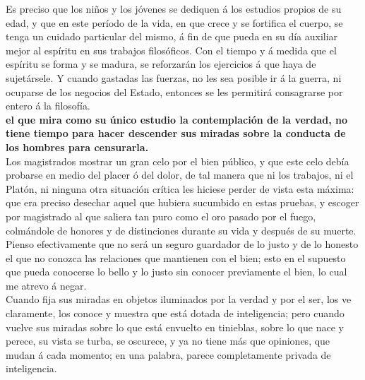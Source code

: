 \documentclass[10pt]{book}
\begin{document}
Es preciso que los niños y los jóvenes se dediquen á los estudios propios de su edad, y que en este período de la vida, en que crece y se fortifica el cuerpo, se tenga un cuidado particular del mismo, á fin de que pueda en su día auxiliar mejor al espíritu en sus trabajos filosóficos. Con el tiempo y á medida que el espíritu se forma y se madura, se reforzarán los ejercicios á que haya de sujetársele. Y cuando gastadas las fuerzas, no les sea posible ir á la guerra, ni ocuparse de los negocios del Estado, entonces se les permitirá consagrarse por entero á la filosofía.\\
\textbf{el que mira como su único estudio la contemplación de la verdad, no tiene tiempo para hacer descender sus miradas sobre la conducta de los hombres para censurarla.}\\
Los magistrados mostrar un gran celo por el bien público, y que este celo debía probarse en medio del placer ó del dolor, de tal manera que ni los trabajos, ni el Platón, ni ninguna otra situación crítica les hiciese perder de vista esta máxima: que era preciso desechar aquel que hubiera sucumbido en estas pruebas, y escoger por magistrado al que saliera tan puro como el oro pasado por el fuego, colmándole de honores y de distinciones durante su vida y después de su muerte.\\
Pienso efectivamente que no será un seguro guardador de lo justo y de lo honesto el que no conozca las relaciones que mantienen con el bien; esto en el supuesto que pueda conocerse lo bello y lo justo sin conocer previamente el bien, lo cual me atrevo á negar. \\
Cuando fija sus miradas en objetos iluminados por la verdad y por el ser, los ve claramente, los conoce y muestra que está dotada de inteligencia; pero cuando vuelve sus miradas sobre lo que está envuelto en tinieblas, sobre lo que nace y perece, su vista se turba, se oscurece, y ya no tiene más que opiniones, que mudan á cada momento; en una palabra, parece completamente privada de inteligencia. \\
\end{document}
